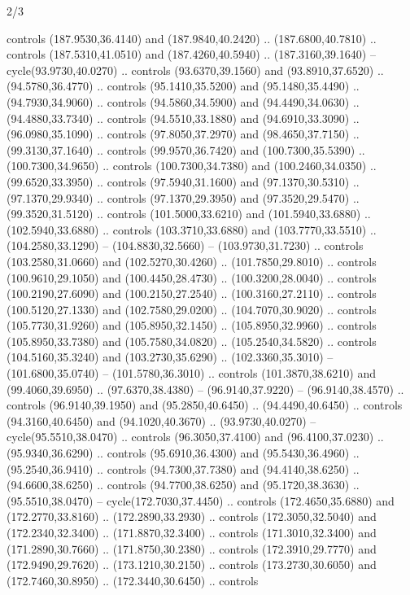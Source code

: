 \begin{flagdescription}{2/3}
\begin{scope}[xshift=0.5\flaglength,yshift=0.5\flagwidth,scale=\stretchfactor]
\begin{scope}[scale=0.001645\flagwidth,yshift=65mm,xshift=-63mm]
\begin{scope}[y=0.80pt, x=0.80pt, yscale=-1,]
\begin{scope}[cm={{1.33333,0.0,0.0,1.33333,(0.0,1e-05)}}]
  controls (187.9530,36.4140) and (187.9840,40.2420) .. (187.6800,40.7810) ..
  controls (187.5310,41.0510) and (187.4260,40.5940) .. (187.3160,39.1640) --
  cycle(93.9730,40.0270) .. controls (93.6370,39.1560) and (93.8910,37.6520) ..
  (94.5780,36.4770) .. controls (95.1410,35.5200) and (95.1480,35.4490) ..
  (94.7930,34.9060) .. controls (94.5860,34.5900) and (94.4490,34.0630) ..
  (94.4880,33.7340) .. controls (94.5510,33.1880) and (94.6910,33.3090) ..
  (96.0980,35.1090) .. controls (97.8050,37.2970) and (98.4650,37.7150) ..
  (99.3130,37.1640) .. controls (99.9570,36.7420) and (100.7300,35.5390) ..
  (100.7300,34.9650) .. controls (100.7300,34.7380) and (100.2460,34.0350) ..
  (99.6520,33.3950) .. controls (97.5940,31.1600) and (97.1370,30.5310) ..
  (97.1370,29.9340) .. controls (97.1370,29.3950) and (97.3520,29.5470) ..
  (99.3520,31.5120) .. controls (101.5000,33.6210) and (101.5940,33.6880) ..
  (102.5940,33.6880) .. controls (103.3710,33.6880) and (103.7770,33.5510) ..
  (104.2580,33.1290) -- (104.8830,32.5660) -- (103.9730,31.7230) .. controls
  (103.2580,31.0660) and (102.5270,30.4260) .. (101.7850,29.8010) .. controls
  (100.9610,29.1050) and (100.4450,28.4730) .. (100.3200,28.0040) .. controls
  (100.2190,27.6090) and (100.2150,27.2540) .. (100.3160,27.2110) .. controls
  (100.5120,27.1330) and (102.7580,29.0200) .. (104.7070,30.9020) .. controls
  (105.7730,31.9260) and (105.8950,32.1450) .. (105.8950,32.9960) .. controls
  (105.8950,33.7380) and (105.7580,34.0820) .. (105.2540,34.5820) .. controls
  (104.5160,35.3240) and (103.2730,35.6290) .. (102.3360,35.3010) --
  (101.6800,35.0740) -- (101.5780,36.3010) .. controls (101.3870,38.6210) and
  (99.4060,39.6950) .. (97.6370,38.4380) -- (96.9140,37.9220) --
  (96.9140,38.4570) .. controls (96.9140,39.1950) and (95.2850,40.6450) ..
  (94.4490,40.6450) .. controls (94.3160,40.6450) and (94.1020,40.3670) ..
  (93.9730,40.0270) -- cycle(95.5510,38.0470) .. controls (96.3050,37.4100) and
  (96.4100,37.0230) .. (95.9340,36.6290) .. controls (95.6910,36.4300) and
  (95.5430,36.4960) .. (95.2540,36.9410) .. controls (94.7300,37.7380) and
  (94.4140,38.6250) .. (94.6600,38.6250) .. controls (94.7700,38.6250) and
  (95.1720,38.3630) .. (95.5510,38.0470) -- cycle(172.7030,37.4450) .. controls
  (172.4650,35.6880) and (172.2770,33.8160) .. (172.2890,33.2930) .. controls
  (172.3050,32.5040) and (172.2340,32.3400) .. (171.8870,32.3400) .. controls
  (171.3010,32.3400) and (171.2890,30.7660) .. (171.8750,30.2380) .. controls
  (172.3910,29.7770) and (172.9490,29.7620) .. (173.1210,30.2150) .. controls
  (173.2730,30.6050) and (172.7460,30.8950) .. (172.3440,30.6450) .. controls

\end{scope}
\end{scope}
\end{scope}
\end{scope}
\end{flagdescription}
